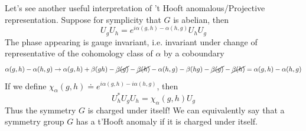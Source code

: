 Let's see another useful interpretation of 't Hooft anomalous/Projective representation. Suppose for symplicity that $G$ is abelian, then
\begin{equation}
    U_g U_h = e^{i \alpha(g,h) - \alpha(h,g)} U_h U_g
\end{equation}
The phase appearing is gauge invariant, i.e. invariant under change of representative of the cohomology class of $\alpha$ by a coboundary
\begin{equation}
    \alpha(g,h) - \alpha(h,g) \to \alpha(g,h) + \beta(gh) - \cancel{\beta(g)} -\cancel{\beta(h)} - \alpha(h,g) - \beta(hg) -\cancel{\beta(g)} -\cancel{\beta(h)} =  \alpha(g,h) - \alpha(h,g)
\end{equation}
If we define $\chi_{\alpha}(g,h) \doteq e^{i \alpha(g,h) - i\alpha(h,g)}$, then
\begin{equation}
     U_h^* U_g U_h = \chi_{\alpha}(g,h) U_g
\end{equation}
Thus the symmetry $G$ is charged under itself! We can equivalently say that a symmetry group $G$ has a t'Hooft anomaly if it is charged under itself.

 
